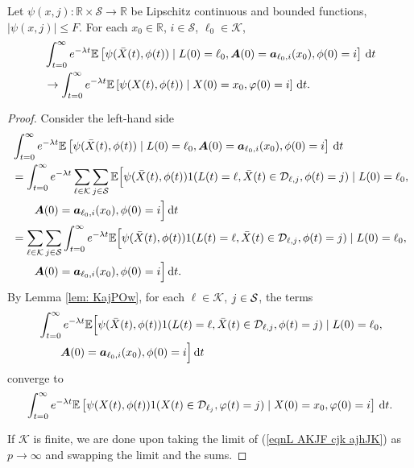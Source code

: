 \begin{cor}\label{cor: lk}
	Let \(\psi(x,j):\mathbb R\times \mathcal S \to \mathbb R\) be Lipschitz continuous and bounded functions, \(|\psi(x,j)|\leq F\). For each \(x_0\in\mathbb R\), \(i\in\mathcal S\), \(\ell_0\in\mathcal K\), 
	\begin{align}
		&\int_{t=0}^\infty e^{-\lambda t}\mathbb E\left[\psi(\bar X(t),\phi(t))  \mid L(0)=\ell_0, \boldsymbol A(0)=\boldsymbol  a_{\ell_0,i}(x_0), \phi(0)=i \right] \, \mathrm{d} t \nonumber
		\\&\to \int_{t=0}^\infty e^{-\lambda t}  \mathbb E\left[\psi(X(t),\phi(t))\mid X(0)=x_0, \varphi(0)=i \right] \, \mathrm{d} t.\nonumber
	\end{align}
\end{cor}
\begin{proof}
	Consider the left-hand side 
	\begin{align}
		&\int_{t=0}^\infty e^{-\lambda t}\mathbb E\left[\psi(\bar X(t),\phi(t))  \mid L(0)=\ell_0, \boldsymbol A(0)=\boldsymbol  a_{\ell_0,i}(x_0), \phi(0)=i \right] \, \mathrm{d} t \nonumber 
		\\&= \int_{t=0}^\infty e^{-\lambda t}\sum_{\ell\in\mathcal K}\sum_{j\in\mathcal S}\mathbb E\Big[\psi(\bar X(t),\phi(t)) 1(L(t)=\ell, \bar X(t) \in \mathcal D_{\ell,j},\phi(t)=j)  \mid L(0)=\ell_0, \nonumber 
		\\&\qquad{} \boldsymbol A(0)=\boldsymbol  a_{\ell_0,i}(x_0), \phi(0)=i \Big] \, \mathrm{d} t \nonumber 
		\\&= \sum_{\ell\in\mathcal K}\sum_{j\in\mathcal S}\int_{t=0}^\infty e^{-\lambda t}\mathbb E\Big[\psi(\bar X(t),\phi(t)) 1(L(t)=\ell, \bar X(t) \in \mathcal D_{\ell,j},\phi(t)=j)  \mid L(0)=\ell_0, \nonumber 
		\\&\qquad{} \boldsymbol A(0)=\boldsymbol  a_{\ell_0,i}(x_0), \phi(0)=i \Big] \, \mathrm{d} t. \label{eqnL AKJF cjk ajhJK}
	\end{align}
	By Lemma \ref{lem: KajPOw}, for each \(\ell\in\mathcal K\), \(j\in\mathcal{S}\), the terms 
	 \begin{align}
	 	&\int_{t=0}^\infty e^{-\lambda t}\mathbb E\Big[\psi(\bar X(t),\phi(t)) 1(L(t)=\ell, \bar X(t) \in \mathcal D_{\ell,j},\phi(t)=j)  \mid L(0)=\ell_0, \nonumber 
		\\&\qquad{} \boldsymbol A(0)=\boldsymbol  a_{\ell_0,i}(x_0), \phi(0)=i \Big] \, \mathrm{d} t
	\end{align}
		converge to 
	\[\int_{t=0}^\infty e^{-\lambda t}  \mathbb E\left[\psi(X(t),\phi(t))1(X(t)\in\mathcal D_{\ell_j},\varphi(t)=j)\mid X(0)=x_0, \varphi(0)=i \right] \, \mathrm{d} t.\]
	
	If \(\mathcal K\) is finite, we are done upon taking the limit of (\ref{eqnL AKJF cjk ajhJK}) as \(p\to\infty\) and swapping the limit and the sums. 
	

\end{proof}
